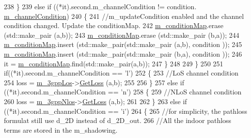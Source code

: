 \begin{DoxyCode}
238                 \}
239                 \textcolor{keywordflow}{else} \textcolor{keywordflow}{if} ((*it).second.m\_channelCondition != condition.
      \hyperlink{structchannelCondition_a1fbbec1a89c5da0961efaca304ade4d1}{m\_channelCondition})
240                 \{
241                         \textcolor{comment}{//m\_updateCondition enabled and the channel condition changed. Update the
       conditionMap.}
242                         \hyperlink{classns3_1_1MmWave3gppBuildingsPropagationLossModel_a18b00c0130a2924ec13a7885543fc569}{m\_conditionMap}.erase (std::make\_pair (a,b));
243                         \hyperlink{classns3_1_1MmWave3gppBuildingsPropagationLossModel_a18b00c0130a2924ec13a7885543fc569}{m\_conditionMap}.erase (std::make\_pair (b,a));
244                         \hyperlink{classns3_1_1MmWave3gppBuildingsPropagationLossModel_a18b00c0130a2924ec13a7885543fc569}{m\_conditionMap}.insert (std::make\_pair(std::make\_pair (a,b), condition
      ));
245                         \hyperlink{classns3_1_1MmWave3gppBuildingsPropagationLossModel_a18b00c0130a2924ec13a7885543fc569}{m\_conditionMap}.insert (std::make\_pair(std::make\_pair (b,a), condition
      ));
246                         it = \hyperlink{classns3_1_1MmWave3gppBuildingsPropagationLossModel_a18b00c0130a2924ec13a7885543fc569}{m\_conditionMap}.find(std::make\_pair(a,b));
247                 \}
248 
249         \}
250 
251         \textcolor{keywordflow}{if}((*it).second.m\_channelCondition == \textcolor{charliteral}{'l'})
252         \{
253                 \textcolor{comment}{//LoS channel condition}
254                 loss = \hyperlink{classns3_1_1MmWave3gppBuildingsPropagationLossModel_a301f6c6643f00646ce16bd114ad22389}{m\_3gppLos}->\hyperlink{classMmWave3gppPropagationLossModel_ae389c108155d92774975e8a8d0de9c6a}{GetLoss} (a,b);
255 
256         \}
257         \textcolor{keywordflow}{else} \textcolor{keywordflow}{if} ((*it).second.m\_channelCondition == \textcolor{charliteral}{'n'})
258         \{
259                 \textcolor{comment}{//NLoS channel condition}
260                 loss = \hyperlink{classns3_1_1MmWave3gppBuildingsPropagationLossModel_a18ac2d667b12fa593c0ea044ad05af82}{m\_3gppNlos}->\hyperlink{classMmWave3gppPropagationLossModel_ae389c108155d92774975e8a8d0de9c6a}{GetLoss} (a,b);
261 
262         \}
263         \textcolor{keywordflow}{else} \textcolor{keywordflow}{if} ((*it).second.m\_channelCondition == \textcolor{charliteral}{'i'})
264         \{
265                 \textcolor{comment}{//for simplicity, the pathloss formulat still use d\_2D instead of d\_2D\_out.}
266                 \textcolor{comment}{//All the indoor pathloss terms are stored in the m\_shadowing.}

\end{DoxyCode}
